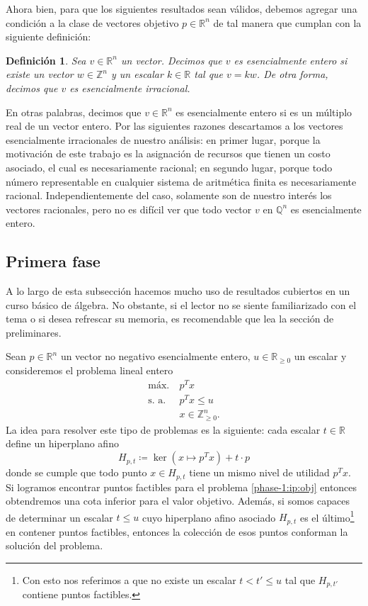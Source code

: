 \documentclass[11pt]{article}
\newtheorem{definition}{Definición}
\begin{document}
Ahora bien, para que los siguientes resultados sean válidos, debemos agregar una condición a la
clase de vectores objetivo $p \in \mathbb{R}^n$ de tal manera que cumplan con la siguiente
definición:
\begin{definition}
	Sea $v \in \mathbb{R}^n$ un vector. Decimos que $v$ es esencialmente entero si existe un vector
	$w \in \mathbb{Z}^n$ y un escalar $k \in \mathbb{R}$ tal que $v = kw$. De otra forma, decimos
	que $v$ es esencialmente irracional.
\end{definition}
En otras palabras, decimos que $v \in \mathbb{R}^n$ es esencialmente entero si es un múltiplo real
de un vector entero. Por las siguientes razones descartamos a los vectores esencialmente
irracionales de nuestro análisis: en primer lugar, porque la motivación de este trabajo es la
asignación de recursos que tienen un costo asociado, el cual es necesariamente racional; en segundo
lugar, porque todo número representable en cualquier sistema de aritmética finita es necesariamente
racional. Independientemente del caso, solamente son de nuestro interés los vectores racionales,
pero no es difícil ver que todo vector $v$ en $\mathbb{Q}^n$ es esencialmente entero.

\subsection*{Primera fase}
A lo largo de esta subsección hacemos mucho uso de resultados cubiertos en un curso básico de
álgebra. No obstante, si el lector no se siente familiarizado con el tema o si desea refrescar su
memoria, es recomendable que lea la sección de preliminares.

Sean $p \in \mathbb{R}^n$ un vector no negativo esencialmente entero, $u \in \mathbb{R}_{\geq 0}$ un
escalar y consideremos el problema lineal entero
\begin{align}
	\text{máx.} ~& p^Tx \label{phase-1:ip:obj} \\
	\text{s. a.} ~& p^Tx \leq u \label{phase-1:ip:prep} \\
				 & x \in \mathbb{Z}_{\geq 0}^n \label{phase-1:ip:non-negative}.
\end{align}
La idea para resolver este tipo de problemas es la siguiente: cada escalar $t \in \mathbb{R}$ define
un hiperplano afino
\begin{equation}
	\label{phase-1:hyper}
	H_{p, t} \coloneq \ker\left( x \mapsto p^Tx \right) + t \cdot p
\end{equation}
donde se cumple que todo punto $x \in H_{p, t}$ tiene un mismo nivel de utilidad $p^Tx$. Si logramos
encontrar puntos factibles para el problema \ref{phase-1:ip:obj} entonces obtendremos una
cota inferior para el valor objetivo. Además, si somos capaces de determinar un escalar $t \leq u$
cuyo hiperplano afino asociado $H_{p, t}$ es el último\footnote{Con esto nos referimos a que no
existe un escalar $t < t' \leq u$ tal que $H_{p, t'}$ contiene puntos factibles.} en contener puntos
factibles, entonces la colección de esos puntos conforman la solución del problema.
\end{document}
